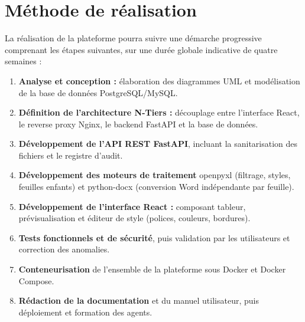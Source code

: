 \chapter{Méthode de réalisation}

La réalisation de la plateforme pourra suivre une démarche progressive comprenant les étapes suivantes, sur une durée globale indicative de quatre semaines :

\begin{enumerate}
    \item \textbf{Analyse et conception :} élaboration des diagrammes UML et modélisation de la base de données PostgreSQL/MySQL.
    \item \textbf{Définition de l'architecture N-Tiers :} découplage entre l'interface React, le reverse proxy Nginx, le backend FastAPI et la base de données.
    \item \textbf{Développement de l'API REST FastAPI}, incluant la sanitarisation des fichiers et le registre d'audit.
    \item \textbf{Développement des moteurs de traitement} openpyxl (filtrage, styles, feuilles enfants) et python-docx (conversion Word indépendante par feuille).
    \item \textbf{Développement de l'interface React :} composant tableur, prévisualisation et éditeur de style (polices, couleurs, bordures).
    \item \textbf{Tests fonctionnels et de sécurité}, puis validation par les utilisateurs et correction des anomalies.
    \item \textbf{Conteneurisation} de l'ensemble de la plateforme sous Docker et Docker Compose.
    \item \textbf{Rédaction de la documentation} et du manuel utilisateur, puis déploiement et formation des agents.
\end{enumerate}
